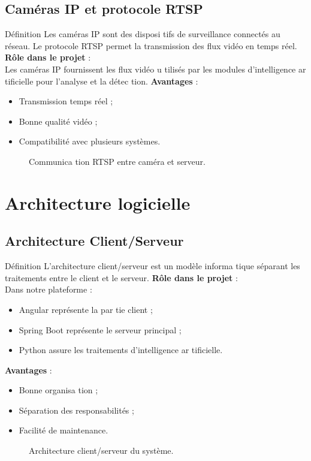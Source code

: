 \documentclass[12pt,a4paper]{report}
\numberwithin{figure}{chapter}
\numberwithin{table}{chapter}
\begin{document}
\subsection{Caméras IP et protocole RTSP}
Déﬁnition
Les caméras IP sont des disposi tifs de surveillance connectés au réseau. Le protocole RTSP permet la
transmission des ﬂux vidéo en temps réel.
\textbf{Rôle dans le projet} : \\
Les caméras IP fournissent les ﬂux vidéo u tilisés par les modules d’intelligence ar tiﬁcielle pour
l’analyse et la détec tion.
\textbf{Avantages} : \\
\begin{itemize}
  \item Transmission temps réel ;
  \item Bonne qualité vidéo ;
  \item Compatibilité avec plusieurs systèmes.
\end{itemize}
\begin{figure}[H]
  \centering
  \caption{Communica tion RTSP entre caméra et serveur.}
\end{figure}
\section{Architecture logicielle}
\subsection{Architecture Client/Serveur}
Déﬁnition
L’architecture client/serveur est un modèle informa tique séparant les traitements entre le client et le
serveur.
\textbf{Rôle dans le projet} : \\
Dans notre plateforme :
\begin{itemize}
  \item Angular représente la par tie client ;
  \item Spring Boot représente le serveur principal ;
  \item Python assure les traitements d’intelligence ar tiﬁcielle.
\end{itemize}
\textbf{Avantages} : \\
\begin{itemize}
  \item Bonne organisa tion ;
  \item Séparation des responsabilités ;
  \item Facilité de maintenance.
\end{itemize}
\begin{figure}[H]
  \centering
  \caption{Architecture client/serveur du système.}
\end{figure}
\end{document}
